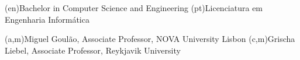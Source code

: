 \ntauthordegree(en){Bachelor in Computer Science and Engineering}
\ntauthordegree(pt){Licenciatura em Engenharia Informática}






(a,m){Miguel Goulão, Associate Professor, NOVA University Lisbon}
(c,m){Grischa Liebel, Associate Professor, Reykjavik University}



